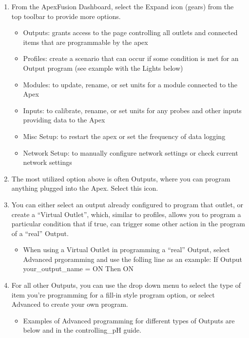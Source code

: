 \documentclass[
]{book}
\providecommand{\tightlist}{%
  \setlength{\itemsep}{0pt}\setlength{\parskip}{0pt}}
\begin{document}
\begin{enumerate}
\def\labelenumi{\arabic{enumi}.}
\tightlist
\item
  From the ApexFusion Dashboard, select the Expand icon (gears) from the top toolbar to provide more options.

  \begin{itemize}
  \tightlist
  \item
    Outputs: grants access to the page controlling all outlets and connected items that are programmable by the apex
  \item
    Profiles: create a scenario that can occur if some condition is met for an Output program (see example with the Lights below)
  \item
    Modules: to update, rename, or set units for a module connected to the Apex
  \item
    Inputs: to calibrate, rename, or set units for any probes and other inputs providing data to the Apex
  \item
    Misc Setup: to restart the apex or set the frequency of data logging
  \item
    Network Setup: to manually configure network settings or check current network settings
  \end{itemize}
\item
  The most utilized option above is often Outputs, where you can program anything plugged into the Apex. Select this icon.
\item
  You can either select an output already configured to program that outlet, or create a ``Virtual Outlet'', which, similar to profiles, allows you to program a particular condition that if true, can trigger some other action in the program of a ``real'' Output.

  \begin{itemize}
  \tightlist
  \item
    When using a Virtual Outlet in programming a ``real'' Output, select Advanced prgoramming and use the folling line as an example: If Output your\_output\_name = ON Then ON
  \end{itemize}
\item
  For all other Outputs, you can use the drop down menu to select the type of item you're programming for a fill-in style program option, or select Advanced to create your own program.

  \begin{itemize}
  \tightlist
  \item
    Examples of Advanced programming for different types of Outputs are below and in the controlling\_pH guide.
  \end{itemize}
\end{enumerate}
\end{document}
